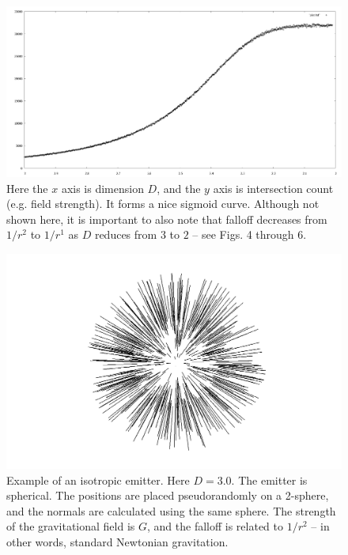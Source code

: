 \documentclass[12pt]{article}
\begin{document}
\begin{figure} 
\centering
  \includegraphics[width = 5 in]{transition.png}
  \caption{
Here the $x$ axis is dimension $D$, and the $y$ axis is intersection count (e.g. field strength).
It forms a nice sigmoid curve.
Although not shown here, it is important to also note that falloff decreases from $1/r^2$ to $1/r^1$ as $D$ reduces from $3$ to $2$ -- see Figs. 4 through 6.
}
\end{figure}








\begin{figure} 
\centering
  \includegraphics[width = 5 in]{3.png}
  \caption{
Example of an isotropic emitter.
Here $D = 3.0$. 
The emitter is spherical.
The positions are placed pseudorandomly on a 2-sphere, and the normals are calculated using the same sphere.
The strength of the gravitational field is $G$, and the falloff is related to $1/r^2$ -- in other words, standard Newtonian gravitation.
}
\end{figure}
\end{document}

